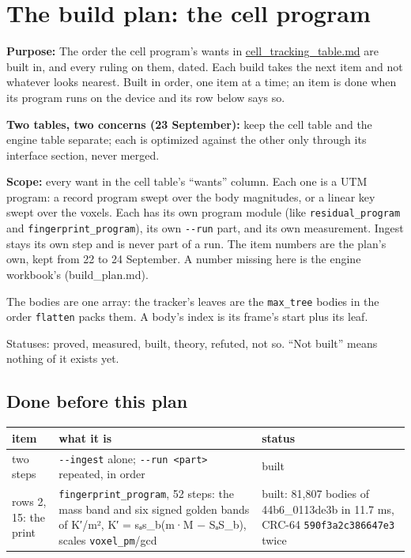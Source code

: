 \chapter{\texorpdfstring{The build plan: the cell program}{The build plan: the cell program}}
\label{chap:build-plan}

\textbf{Purpose:} The order the cell program's wants in \hyperref[chap:cell-tracking-table]{cell\_\allowbreak{}tracking\_\allowbreak{}table.md} are built in, and every ruling on them, dated. Each build takes the next item and not whatever looks nearest. Built in order, one item at a time; an item is done when its program runs on the device and its row below says so.

\textbf{Two tables, two concerns (23 September):} keep the cell table and the engine table separate; each is optimized against the other only through its interface section, never merged.

\textbf{Scope:} every want in the cell table's “wants” column. Each one is a UTM program: a record program swept over the body magnitudes, or a linear key swept over the voxels. Each has its own program module (like \texttt{residual\_\allowbreak{}program} and \texttt{fingerprint\_\allowbreak{}program}), its own \texttt{-\allowbreak{}-\allowbreak{}run} part, and its own measurement. Ingest stays its own step and is never part of a run. The item numbers are the plan's own, kept from 22 to 24 September. A number missing here is the engine workbook's (build\_\allowbreak{}plan.md).

The bodies are one array: the tracker's leaves are the \texttt{max\_\allowbreak{}tree} bodies in the order \texttt{flatten} packs them. A body's index is its frame's start plus its leaf.

Statuses: proved, measured, built, theory, refuted, not so. “Not built” means nothing of it exists yet.

\section{\texorpdfstring{Done before this plan}{Done before this plan}}

{\small
\setlength{\tabcolsep}{6pt}
\begin{longtable}{>{\RaggedRight\arraybackslash}p{}>{\RaggedRight\arraybackslash}p{}>{\RaggedRight\arraybackslash}p{}}
\toprule
item & what it is & status \\
\midrule
\endhead
two steps & \texttt{-\allowbreak{}-\allowbreak{}ingest} alone; \texttt{-\allowbreak{}-\allowbreak{}run <part>} repeated, in order & built \\
rows 2, 15: the print & \texttt{fingerprint\_\allowbreak{}program}, 52 steps: the mass band and six signed golden bands of K′/m², K′ = sₐs\_\allowbreak{}b(m·M − SₐS\_\allowbreak{}b), scales \texttt{voxel\_\allowbreak{}pm}/gcd & built: 81,807 bodies of 44b6\_\allowbreak{}0113de3b in 11.7 ms, CRC-64 \texttt{590f3a2c386647e3} twice \\
\bottomrule
\end{longtable}
}

